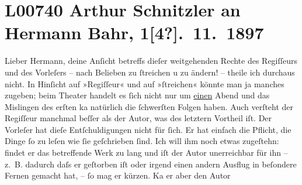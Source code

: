 

\section[Arthur Schnitzler an Hermann Bahr, 1{[}4?{]}. 11. 1897]{L00740 Arthur Schnitzler an Hermann Bahr, 1{[}4?{]}. 11. 1897}
\nopagebreak{}
\rehead{ }\normalsize\beginnumbering{}
\toendnotes[C]{\smallbreak\pagebreak[2]}
\toendnotes[C]{\smallbreak}
\pstart
           \noindent{}{\pb}Lieber Hermann, deine Anſicht betreffs dieſer weitgehenden Rechte
               des Regiſſeurs und des Vorleſers – nach Belieben zu ſtreichen u zu ändern! – theile
               ich durchaus nicht. In Hinſicht auf »Regiſſeur« und auf »ſtreichen« könnte man \introOben{}ja\introOben{} manches zugeben; beim Theater handelt es ſich nicht nur um
                  \uline{einen} Abend und das Mislingen des erſten ka{\geminationn} natürlich die ſchwerſten Folgen haben. Auch verſteht
                  {\pb}der Regiſſeur
               manchmal beſſer als der Autor, was des letztern Vortheil iſt. Der Vorleſer hat dieſe
               Entſchuldigungen nicht für ſich. Er hat einfach die Pflicht, die Dinge ſo zu leſen
               wie ſie geſchrieben ſind. Ich will ihm noch etwas zugeſtehn: findet er das
               betreffende Werk zu lang und iſt der Autor unerreichbar für ihn – z. B. dadurch daſs
               er geſtorben iſt oder irgend einen andern Ausflug in {\pb}beſondere Fernen
               gemacht hat, – ſo mag er kürzen. Ka{\geminationn} er aber den Autor
